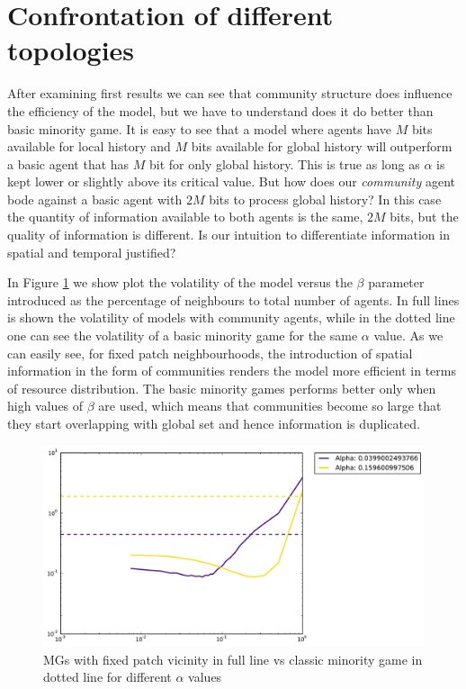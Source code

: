 \section{Confrontation of different topologies}
\label{sec:confrontation}

After examining first results we can see that community structure does influence the efficiency of the model, but we have to understand does it do better than basic minority game.
It is easy to see that a model where agents have $M$ bits available for local history and $M$ bits available for global history will outperform a basic agent that has $M$ bit for only global history.
This is true as long as $\alpha$ is kept lower or slightly above its critical value.
But how does our \textit{community} agent bode against a basic agent with $2M$ bits to process global history?
In this case the quantity of information available to both agents is the same, $2M$ bits, but the quality of information is different.
Is our intuition to differentiate information in spatial and temporal justified?

In Figure \ref{fig:fixed vicinity full classic} we show plot the volatility of the model versus the $\beta$ parameter introduced as the percentage of neighbours to total number of agents.
In full lines is shown the volatility of models with community agents, while in the dotted line one can see the volatility of a basic minority game for the same $\alpha$ value.
As we can easily see, for fixed patch neighbourhoods, the introduction of spatial information in the form of communities renders the model more efficient in terms of resource distribution.
The basic minority games performs better only when high values of $\beta$ are used, which means that communities become so large that they start overlapping with global set and hence information is duplicated.

\begin{figure}[h]
\begin{center}
\includegraphics[scale=0.4]{images/results/vicinity_patch_n401_rounds10000_full_time.pdf}
\caption{MGs with fixed patch vicinity in full line vs classic minority game in dotted line for different $\alpha$ values}
\label{fig:fixed vicinity full classic}
\end{center}
\end{figure}

